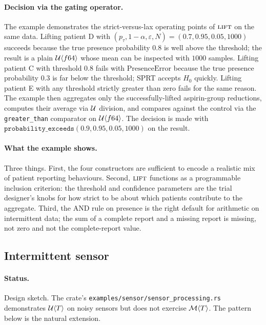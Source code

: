 \paragraph{Decision via the gating operator.} The example demonstrates the
strict-versus-lax operating points of $\textsc{lift}$ on the same data.
Lifting patient D with $(p_\tau, 1-\alpha, \varepsilon, N) = (0.7, 0.95,
0.05, 1000)$ succeeds because the true presence probability $0.8$ is well
above the threshold; the result is a plain $\mathcal{U}\langle f64 \rangle$
whose mean can be inspected with $1000$ samples. Lifting patient C with
threshold $0.8$ fails with $\mathrm{PresenceError}$ because the true
presence probability $0.3$ is far below the threshold; SPRT accepts $H_0$
quickly. Lifting patient E with any threshold strictly greater than zero
fails for the same reason. The example then aggregates only the
successfully-lifted aspirin-group reductions, computes their average via
$\mathcal{U}$ division, and compares against the control via the
\texttt{greater\_than} comparator on $\mathcal{U}\langle f64 \rangle$. The
decision is made with $\texttt{probability\_exceeds}(0.9, 0.95, 0.05,
1000)$ on the result.

\paragraph{What the example shows.} Three things. First, the four
constructors are sufficient to encode a realistic mix of patient
reporting behaviours. Second, $\textsc{lift}$ functions as a programmable
inclusion criterion: the threshold and confidence parameters are the
trial designer's knobs for how strict to be about which patients
contribute to the aggregate. Third, the AND rule on presence is the
right default for arithmetic on intermittent data; the sum of a complete
report and a missing report is missing, not zero and not the
complete-report value.

\subsection{Intermittent sensor}
\label{sec:examples:sensor}

\paragraph{Status.} Design sketch. The crate's
\texttt{examples/sensor/sensor\_processing.rs} demonstrates
$\mathcal{U}\langle T \rangle$ on noisy sensors but does not exercise
$\mathcal{M}\langle T \rangle$. The pattern below is the natural extension.


